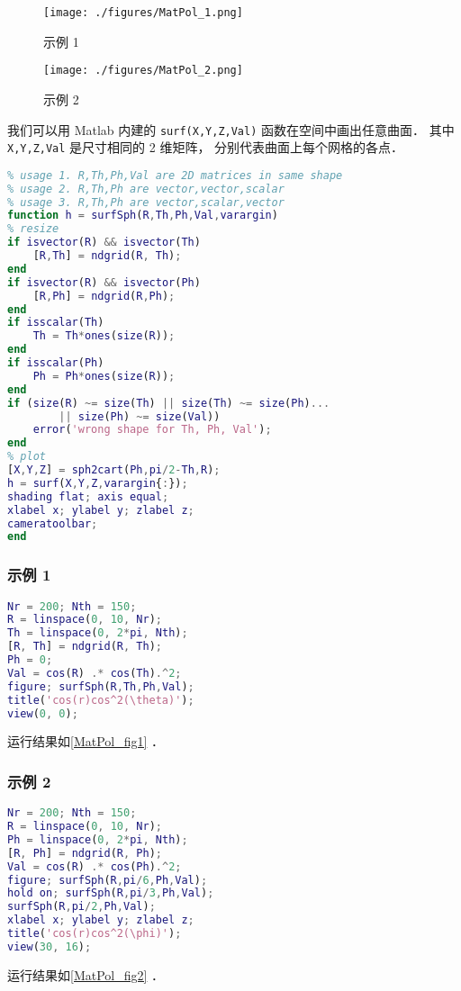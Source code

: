 
\begin{issues}
\issueAbstract
\end{issues}

\begin{figure}[ht]
\centering
\texttt{[image: ./figures/MatPol\_1.png]}
\caption{示例 1} \label{MatPol_fig1}
\end{figure}
\begin{figure}[ht]
\centering
\texttt{[image: ./figures/MatPol\_2.png]}
\caption{示例 2} \label{MatPol_fig2}
\end{figure}

我们可以用 Matlab 内建的 \verb|surf(X,Y,Z,Val)| 函数在空间中画出任意曲面． 其中 \verb|X,Y,Z,Val| 是尺寸相同的 2 维矩阵， 分别代表曲面上每个网格的各点．
\begin{lstlisting}[language=matlab, caption=surfSph.m]
% surf() in spherical coordinate
% usage 1. R,Th,Ph,Val are 2D matrices in same shape
% usage 2. R,Th,Ph are vector,vector,scalar
% usage 3. R,Th,Ph are vector,scalar,vector
function h = surfSph(R,Th,Ph,Val,varargin)
% resize
if isvector(R) && isvector(Th)
    [R,Th] = ndgrid(R, Th);
end
if isvector(R) && isvector(Ph)
    [R,Ph] = ndgrid(R,Ph);
end
if isscalar(Th)
    Th = Th*ones(size(R));
end
if isscalar(Ph)
    Ph = Ph*ones(size(R));
end
if (size(R) ~= size(Th) || size(Th) ~= size(Ph)...
        || size(Ph) ~= size(Val))
    error('wrong shape for Th, Ph, Val');
end
% plot
[X,Y,Z] = sph2cart(Ph,pi/2-Th,R);
h = surf(X,Y,Z,varargin{:});
shading flat; axis equal;
xlabel x; ylabel y; zlabel z;
cameratoolbar;
end
\end{lstlisting}

\subsubsection{示例 1}
\begin{lstlisting}[language=matlab]
Nr = 200; Nth = 150;
R = linspace(0, 10, Nr);
Th = linspace(0, 2*pi, Nth);
[R, Th] = ndgrid(R, Th);
Ph = 0;
Val = cos(R) .* cos(Th).^2;
figure; surfSph(R,Th,Ph,Val);
title('cos(r)cos^2(\theta)');
view(0, 0);
\end{lstlisting}
运行结果如\autoref{MatPol_fig1} ．

\subsubsection{示例 2}
\begin{lstlisting}[language=matlab]
Nr = 200; Nth = 150;
R = linspace(0, 10, Nr);
Ph = linspace(0, 2*pi, Nth);
[R, Ph] = ndgrid(R, Ph);
Val = cos(R) .* cos(Ph).^2;
figure; surfSph(R,pi/6,Ph,Val);
hold on; surfSph(R,pi/3,Ph,Val);
surfSph(R,pi/2,Ph,Val);
xlabel x; ylabel y; zlabel z;
title('cos(r)cos^2(\phi)');
view(30, 16);
\end{lstlisting}
运行结果如\autoref{MatPol_fig2} ．
